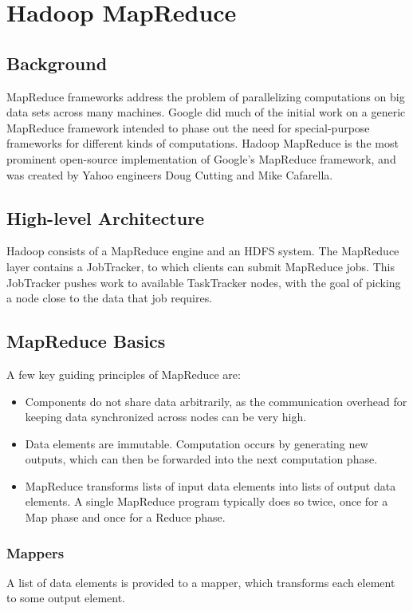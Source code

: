 \documentclass[12pt,titlepage]{article}
\begin{document}
  \newpage

  \section{Hadoop MapReduce}

    \subsection{Background}
      MapReduce frameworks address the problem of parallelizing computations on big data sets across many machines. Google did much of the initial work on a generic
      MapReduce framework intended to phase out the need for special-purpose frameworks for different kinds of computations. Hadoop MapReduce is the most prominent
      open-source implementation of Google's MapReduce framework, and was created by Yahoo engineers Doug Cutting and Mike Cafarella.

    \subsection{High-level Architecture}
      Hadoop consists of a MapReduce engine and an HDFS system. The MapReduce layer contains a JobTracker, to which clients can submit MapReduce jobs. This JobTracker
      pushes work to available TaskTracker nodes, with the goal of picking a node close to the data that job requires.

    \subsection{MapReduce Basics}
      A few key guiding principles of MapReduce are:
      \begin{itemize}
        \item Components do not share data arbitrarily, as the communication overhead for keeping data synchronized across nodes can be very high.
        \item Data elements are immutable. Computation occurs by generating new outputs, which can then be forwarded into the next computation phase.
        \item MapReduce transforms lists of input data elements into lists of output data elements. A single MapReduce program typically does so twice, once for a
        Map phase and once for a Reduce phase.
      \end{itemize}

      \subsubsection{Mappers}
        A list of data elements is provided to a mapper, which transforms each element to some output element.
\end{document}
